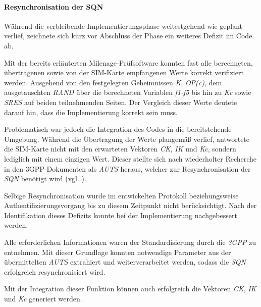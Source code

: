 		\paragraph{Resynchronisation der SQN} Während die verbleibende
		Implementierungsphase weitestgehend wie geplant verlief, zeichnete
		sich kurz vor Abschluss der Phase ein weiteres Defizit im Code ab.

		Mit der bereits erläuterten Milenage-Prüfsoftware konnten fast
		alle berechneten, übertragenen sowie von der SIM-Karte empfangenen
		Werte korrekt verifiziert werden. Ausgehend von den festgelegten
		Geheimnissen \textit{K}, \textit{OP(c)}, dem ausgetauschten \textit{RAND}
		über die berechneten Variablen \textit{f1-f5} bis hin zu \textit{Kc} sowie
		\textit{SRES} auf beiden teilnehmenden Seiten.
		Der Vergleich dieser Werte deutete darauf hin, dass die Implementierung
		korrekt sein muss.

		Problematisch war jedoch die Integration des Codes in die bereitstehende
		Umgebung. Während die Übertragung der Werte plangemäß verlief, antwortete
		die SIM-Karte nicht mit den erwarteten Vektoren \textit{CK}, \textit{IK}
		und \textit{Kc}, sondern lediglich mit einem einzigen Wert. Dieser
		stellte sich nach wiederholter Recherche in den 3GPP-Dokumenten als
		\textit{AUTS} heraus, welcher zur Resynchronisation der \textit{SQN}
		benötigt wird (vgl. ).

		Selbige Resynchronisation wurde im entwickelten
		Protokoll beziehungsweise Authentifizierungsvorgang bis zu diesem Zeitpunkt
		nicht berücksichtigt. Nach der Identifikation dieses Defizits
		konnte bei der Implementierung nachgebessert werden.

		Alle erforderlichen Informationen waren der Standardisierung
		durch die \textit{3GPP} zu entnehmen. Mit dieser Grundlage konnten
		notwendige Parameter aus der übermittelten \textit{AUTS} extrahiert
		und weiterverarbeitet werden, sodass die \textit{SQN} erfolgreich
		resynchronisiert wird. 

		Mit der Integration dieser Funktion können auch erfolgreich die
		Vektoren \textit{CK}, \textit{IK} und \textit{Kc} generiert werden.

\clearpage